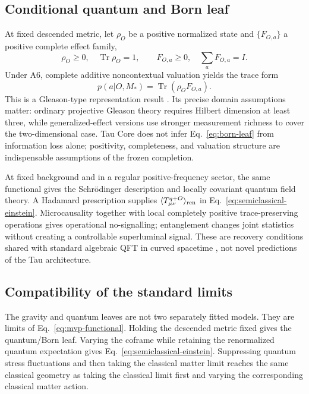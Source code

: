 \documentclass[11pt]{article}
\begin{document}
\subsection{Conditional quantum and Born leaf}
\label{sec:mvp-quantum}

At fixed descended metric, let \(\rho_O\) be a positive normalized state and
\(\{F_{O,a}\}\) a positive complete effect family,
\begin{equation}
  \rho_O\geq0,\quad \operatorname{Tr}\rho_O=1,
  \qquad F_{O,a}\geq0,\quad \sum_aF_{O,a}=I.
  \label{eq:state-effects}
\end{equation}
Under A6, complete additive noncontextual valuation yields the trace form
\begin{equation}
  \boxed{p(a|O,M_*)=\operatorname{Tr}(\rho_OF_{O,a}).}
  \label{eq:born-leaf}
\end{equation}
This is a Gleason-type representation result
\cite{Gleason1957,Busch2003}.  Its precise domain assumptions matter:
ordinary projective Gleason theory requires Hilbert dimension at least three,
while generalized-effect versions use stronger measurement richness to cover
the two-dimensional case.  Tau Core does not infer Eq.~\eqref{eq:born-leaf}
from information loss alone; positivity, completeness, and valuation
structure are indispensable assumptions of the frozen completion.

At fixed background and in a regular positive-frequency sector, the same
functional gives the Schr\"odinger description and locally covariant quantum
field theory.  A Hadamard prescription supplies
  \(\langle T_{\mu\nu}^{q+O}\rangle_{\rm ren}\) in
Eq.~\eqref{eq:semiclassical-einstein}.  Microcausality together with local
completely positive trace-preserving operations gives operational
no-signalling; entanglement changes joint statistics without creating a
controllable superluminal signal.  These are recovery conditions shared with
standard algebraic QFT in curved spacetime
\cite{BrunettiFredenhagenVerch2003,HollandsWald2001,HollandsWald2002}, not
novel predictions of the Tau architecture.

\subsection{Compatibility of the standard limits}

The gravity and quantum leaves are not two separately fitted models.  They are
limits of Eq.~\eqref{eq:mvp-functional}.  Holding the descended metric fixed
gives the quantum/Born leaf.  Varying the coframe while retaining the
renormalized quantum expectation gives Eq.~\eqref{eq:semiclassical-einstein}.
Suppressing quantum stress fluctuations and then taking the classical matter
limit reaches the same classical geometry as taking the classical limit first
and varying the corresponding classical matter action.
\end{document}
